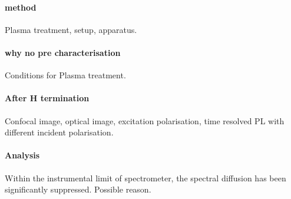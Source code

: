 \paragraph{method} Plasma treatment, setup, apparatus.

\paragraph{why no pre characterisation} Conditions for Plasma treatment.

\paragraph{After H termination} Confocal image, optical image, excitation polarisation, time resolved PL with different incident polarisation.


\paragraph{Analysis} Within the instrumental limit of spectrometer, the spectral diffusion has been significantly suppressed. Possible reason.